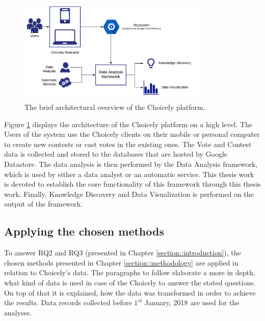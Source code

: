     \begin{figure}[h] 
		\begin{center}
            \includegraphics[width=0.8\textwidth]{Images/architecture.png}
			\caption{The brief architectural overview of the Choicely platform.}
			\label{choicely_architecture}
		\end{center}
    \end{figure}

    Figure \ref{choicely_architecture} displays the architecture of the Choicely platform on a high level. The Users of the system use the Choicely clients on their mobile or personal computer to create new contests or cast votes in the existing ones. 
    The Vote and Contest data is collected and stored to the databases that are hosted by Google Datastore. The data analysis is then performed by the Data Analysis framework, which is used by either a data analyst or an automatic service. This thesis work is devoted to establish the core functionality of this framework through this thesis work. Finally, Knowledge Discovery and Data Visualization is performed on the output of the framework. 

    \subsection{Applying the chosen methods}
    To answer RQ2 and RQ3 (presented in Chapter \ref{section::introduction}), the chosen methods presented in Chapter \ref{section::methodology} are applied in relation to Choicely's data. The paragraphs to follow elaborate a more in depth, what kind of data is used in case of the Choicely to answer the stated questions. On top of that it is explained, how the data was transformed in order to achieve the results. Data records collected before $1^{st}$ January, 2018 are used for the analyses. 

